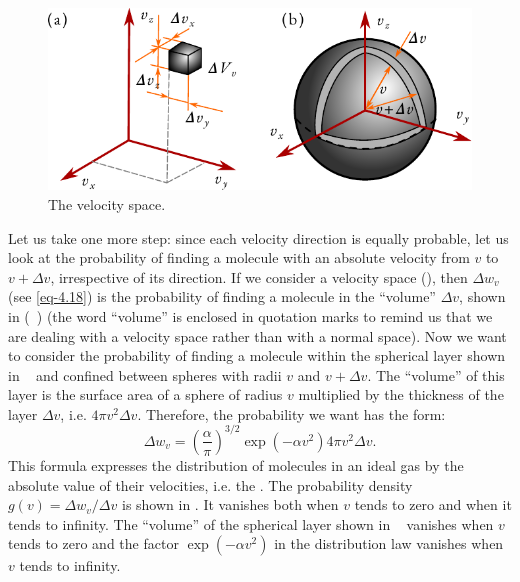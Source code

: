 	
\begin{figure}[!ht]
\centering
\includegraphics[width=0.9\tfwidth]{figures/velspace.pdf}
\caption{The velocity space.\label{vel-space}}
\end{figure}
Let us take one more step: since each velocity direction is equally probable, let us look at the probability of finding a molecule with an absolute	velocity from $v$ to $v + \Delta v$,	irrespective of	its direction. If	we consider a velocity space (), then $\Delta w_{v}$ (see \eqref{eq-4.18}) is the probability of finding a molecule in the ``volume'' $\Delta v$, shown in (~) (the word ``volume'' is enclosed in quotation marks to remind us that we are dealing with a velocity space rather than with a normal space). Now we want to consider the probability of finding a molecule within the spherical layer shown in ~ and confined between spheres with radii $v$ and $v + \Delta v$. The ``volume'' of this layer is the surface area of a sphere of radius $v$ multiplied by the thickness of the layer $\Delta v$, i.e. $4 \pi v^{2} \Delta v$. Therefore, the probability we want has the form:
\begin{equation}%
\Delta w_{v}  = \left(\frac{\alpha}{\pi} \right) ^{3/2} \exp (- \alpha v^{2})  4 \pi v^{2} \Delta v.
\label{eq-4.19}
\end{equation}
This formula expresses the distribution of molecules in an ideal gas by the absolute value of their velocities, i.e. the . The probability density $g (v) = \Delta w_{v} / \Delta v$ is shown in . It vanishes both when $v$ tends to zero and when it tends to infinity. The ``volume'' of the spherical layer shown in ~ vanishes when $v$ tends to zero and the factor $\exp(- \alpha v^{2})$ in the distribution law vanishes when $v$ tends to infinity.

